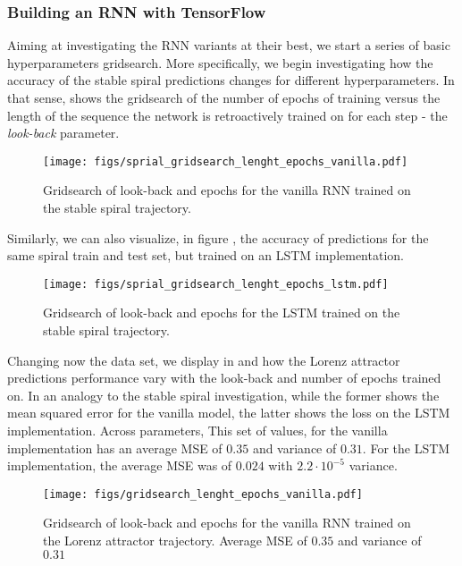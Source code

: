 \subsubsection{Building an RNN with TensorFlow}\label{subsubsection:RNN_TF}

Aiming at investigating the RNN variants at their best, we start a series of basic hyperparameters gridsearch. More specifically, we begin investigating how the accuracy of the stable spiral predictions changes for different hyperparameters. In that sense,  shows the gridsearch of the number of epochs of training versus the length of the sequence the network is retroactively trained on for each step - the \emph{look-back} parameter.


\begin{figure}
    \centering
\texttt{[image: figs/sprial\_gridsearch\_lenght\_epochs\_vanilla.pdf]}
    \caption{Gridsearch of look-back and epochs for the vanilla RNN trained on the stable spiral trajectory.}
    \label{fig:hyperparams_vanilla_spiral}
\end{figure}


Similarly, we can also visualize, in figure , the accuracy of predictions for the same spiral train and test set, but trained on an LSTM implementation.

\begin{figure}
    \centering
\texttt{[image: figs/sprial\_gridsearch\_lenght\_epochs\_lstm.pdf]}
    \caption{Gridsearch of look-back and epochs for the LSTM trained on the stable spiral trajectory.}
    \label{fig:hyperparams_lstm_spiral}
\end{figure}


Changing now the data set, we display in  and  how the Lorenz attractor predictions performance vary with the look-back and number of epochs trained on. In an analogy to the stable spiral investigation, while the former shows the mean squared error for the vanilla model, the latter shows the loss on the LSTM implementation. Across parameters, This set of values, for the vanilla implementation has an average MSE of $0.35$ and variance of $0.31$. For
the LSTM implementation, the average MSE was of $0.024$ with $2.2 \cdot 10^{-5}$ variance. 

\begin{figure}
    \centering
\texttt{[image: figs/gridsearch\_lenght\_epochs\_vanilla.pdf]}
    \caption{Gridsearch of look-back and epochs for the
vanilla RNN trained on the Lorenz attractor trajectory. Average MSE of $0.35$ and variance of $0.31$}
    \label{fig:hyperparams_vanilla_lorenz}
\end{figure}

